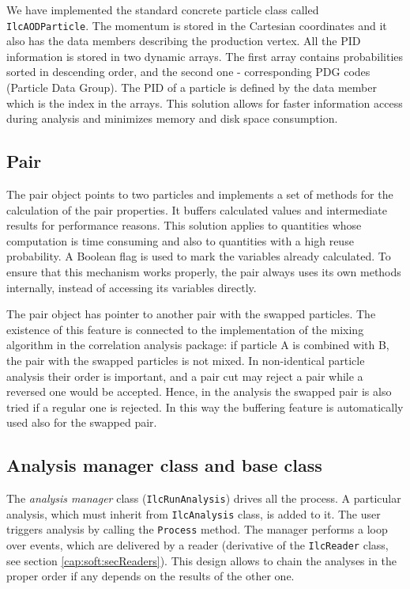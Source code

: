 \documentclass[12pt,a4paper,twoside]{article}
\begin{document}
{We have implemented the standard concrete particle class 
called \texttt{IlcAODParticle}. The momentum is stored in the
Cartesian coordinates and it also has the data members 
describing the production vertex. All the PID information
is stored in two dynamic arrays. The first array contains
probabilities sorted in descending order,
and the second one  - corresponding PDG codes (Particle Data Group).
The PID of a particle is defined by the data member which is 
the index in the arrays. This solution allows for faster information
access during analysis and minimizes memory and disk space consumption.



\subsection{Pair}

The pair object points to two particles and implements
a set of methods for the calculation of the  pair properties.
It buffers calculated values and intermediate
results for performance reasons. This solution applies to
quantities whose computation is time consuming and
also to quantities with a high reuse probability. A
Boolean flag is used to mark the variables already calculated. 
To ensure that this mechanism works properly, 
the pair always uses its own methods internally, 
instead of accessing its variables directly.

The pair object has pointer to another pair with the swapped
particles. The existence of this feature is connected to
the implementation of the mixing algorithm in the correlation 
analysis package: if particle A is combined with B, 
the pair with the swapped particles is not mixed. 
In non-identical particle analysis their order is important, and
a pair cut may reject a pair while a reversed one would be
accepted. Hence, in the analysis the swapped pair is also tried 
if a regular one is rejected. In this way the buffering feature is
automatically used also for the swapped pair.


\subsection{Analysis manager class and base class}

The {\it analysis manager} class (\texttt{IlcRunAnalysis}) drives all
the process. A particular analysis, which must inherit from 
\texttt{IlcAnalysis} class, is added to it. 
The user triggers analysis by calling the \texttt{Process} method. 
The manager performs a loop over events, which are delivered by 
a reader (derivative of the \texttt{IlcReader} class, see section 
\ref{cap:soft:secReaders}).
This design allows to chain the analyses in the proper order if any 
depends on the results of the other one. 

}
\end{document}

